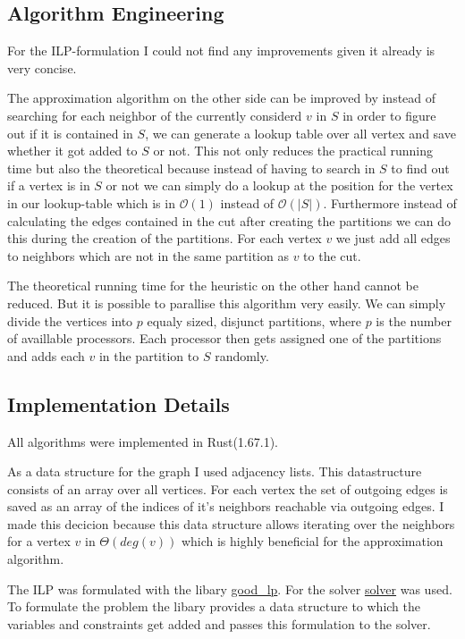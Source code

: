 \documentclass[twocolumn]{article}
\begin{document}
\subsection{Algorithm Engineering}
For the ILP-formulation I could not find any improvements given it already is very concise.

The approximation algorithm on the other side can be improved by instead of searching for each neighbor of the currently considerd $v$ in $S$
in order to figure out if it is contained in $S$, we can generate a lookup table over all vertex and save whether it got added to $S$ or not.
This not only reduces the practical running time but also the theoretical because instead of having to search in $S$ to find out if a vertex is
in $S$ or not we can simply do a lookup at the position for the vertex in our lookup-table which is in $\mathcal{O}(1)$ instead of $\mathcal{O}(|S|)$.
Furthermore instead of calculating the edges contained in the cut after creating the partitions we can do this during the creation of the partitions.
For each vertex $v$ we just add all edges to neighbors which are not in the same partition as $v$ to the cut.

The theoretical running time for the heuristic on the other hand cannot be reduced. But it is possible to parallise this algorithm very easily.
We can simply divide the vertices into $p$ equaly sized, disjunct partitions, where $p$ is the number of availlable processors.
Each processor then gets assigned one of the partitions and adds each $v$ in the partition to $S$ randomly.

\subsection{Implementation Details}

All algorithms were implemented in Rust(1.67.1).

As a data structure for the graph I used adjacency lists. This datastructure consists of an array over all vertices. 
For each vertex the set of outgoing edges is saved as an array of the indices of it's neighbors reachable via outgoing edges.
I made this decicion because this data structure allows iterating over the neighbors for
a vertex $v$ in $\Theta(deg(v))$ which is highly beneficial for the approximation algorithm.

The ILP was formulated with the libary \href{https://crates.io/crates/good\_lp}{good\_lp}. For the solver \href{d}{solver} was used.
To formulate the problem the libary provides a data structure to which the variables and constraints get added and passes this
formulation to the solver.
\end{document}
